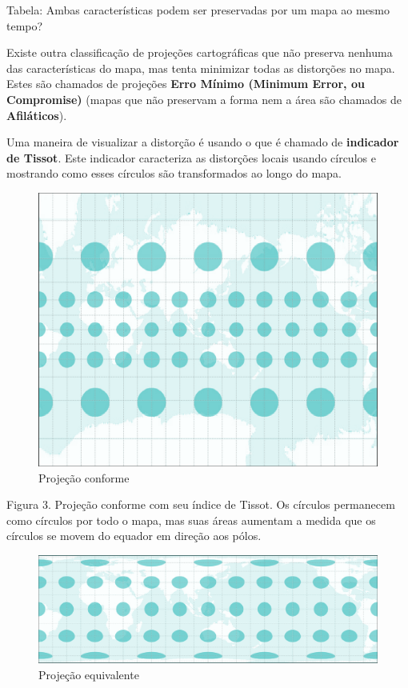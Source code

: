 \documentclass[
  portuguese,
]{krantz}
\begin{document}
Tabela: Ambas características podem ser preservadas por um mapa ao mesmo tempo?

Existe outra classificação de projeções cartográficas que não preserva nenhuma das características do mapa, mas tenta minimizar todas as distorções no mapa. Estes são chamados de projeções \textbf{Erro Mínimo (Minimum Error, ou Compromise)} (mapas que não preservam a forma nem a área são chamados de \textbf{Afiláticos}).

Uma maneira de visualizar a distorção é usando o que é chamado de \textbf{indicador de Tissot}. Este indicador caracteriza as distorções locais usando círculos e mostrando como esses círculos são transformados ao longo do mapa.

\begin{figure}
\centering
\includegraphics{media/modulo0/conformal.png}
\caption{Projeção conforme}
\end{figure}

Figura 3. Projeção conforme com seu índice de Tissot. Os círculos permanecem como círculos por todo o mapa, mas suas áreas aumentam a medida que os círculos se movem do equador em direção aos pólos.

\begin{figure}
\centering
\includegraphics{media/modulo0/authalic.png}
\caption{Projeção equivalente}
\end{figure}
\end{document}
